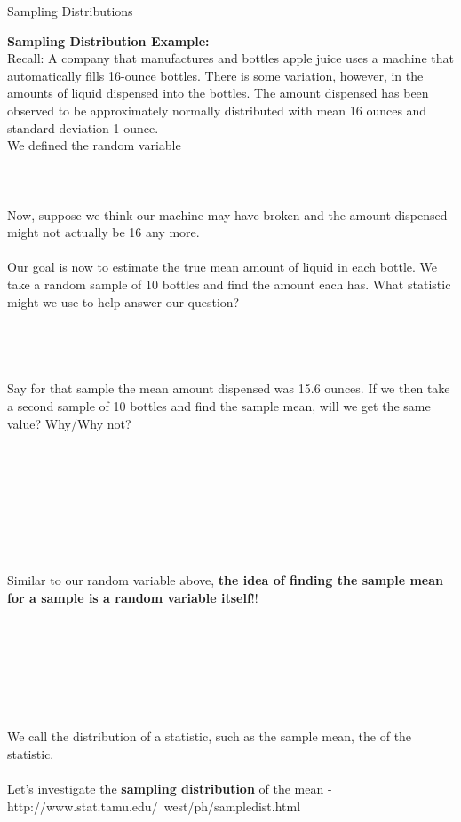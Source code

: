 \huge Sampling Distributions\\\normalsize

\textbf{Sampling Distribution Example:}\\
Recall: A company that manufactures and bottles apple juice uses a machine that automatically fills 16-ounce bottles. There is some variation, however, in the amounts of liquid dispensed into the bottles.  The amount dispensed has been observed to be approximately normally distributed with mean 16 ounces and standard deviation 1 ounce.\\
We defined the random variable\\~\\~\\~\\

Now, suppose we think our machine may have broken and the amount dispensed might not actually be 16 any more.\\~\\
Our goal is now to estimate the true mean amount of liquid in each bottle.  We take a random sample of 10 bottles and find the amount each has.  What statistic might we use to help answer our question?\\~\\~\\~\\~\\

Say for that sample the mean amount dispensed was 15.6 ounces.  If we then take a second sample of 10 bottles and find the sample mean, will we get the same value?  Why/Why not?\\~\\~\\~\\~\\~\\~\\~\\~\\

Similar to our random variable above, \textbf{the idea of finding the sample mean for a sample is a random variable itself}!!\\~\\~\\~\\~\\~\\~\\~\\

We call the distribution of a statistic, such as the sample mean, the \underbar{~~~~~~~~~~~~~~~~~~~~~~~~~~~~~~~~~~~~~~~~~~~~~~~~~~~~~} of the statistic.\\~\\
Let's investigate the \textbf{sampling distribution} of the mean - http://www.stat.tamu.edu/~west/ph/sampledist.html

